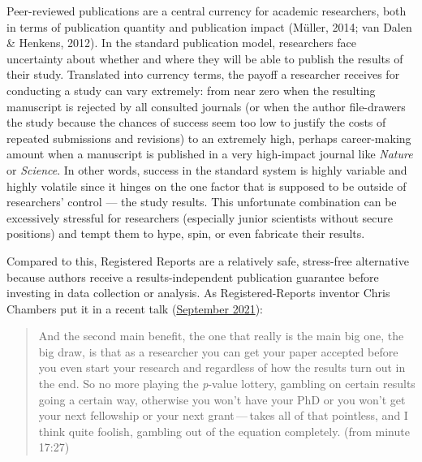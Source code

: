 \documentclass[british,,man,mask,floatsintext]{apa6}
\begin{document}
Peer-reviewed publications are a central currency for academic researchers, both in terms of publication quantity and publication impact (Müller, 2014; van Dalen \& Henkens, 2012).
In the standard publication model, researchers face uncertainty about whether and where they will be able to publish the results of their study. Translated into currency terms, the payoff a researcher receives for conducting a study can vary extremely:
from near zero when the resulting manuscript is rejected by all consulted journals (or when the author file-drawers the study because the chances of success seem too low to justify the costs of repeated submissions and revisions) to an extremely high, perhaps career-making amount when a manuscript is published in a very high-impact journal like \emph{Nature} or \emph{Science}.
In other words, success in the standard system is highly variable and highly volatile since it hinges on the one factor that is supposed to be outside of researchers' control --- the study results.
This unfortunate combination can be excessively stressful for researchers (especially junior scientists without secure positions) and tempt them to hype, spin, or even fabricate their results.

Compared to this, Registered Reports are a relatively safe, stress-free alternative because authors receive a results-independent publication guarantee before investing in data collection or analysis.
As Registered-Reports inventor Chris Chambers put it in a recent talk (\href{https://youtu.be/FiVI3cwVMZI?list=PLChfyH8TVDGmYENpXUDPaeeq2SLh8q9dt\&t=1047}{September 2021}):

\begin{quote}
And the second main benefit, the one that really is the main big one, the big draw, is that as a researcher you can get your paper accepted before you even start your research and regardless of how the results turn out in the end. So no more playing the \emph{p}-value lottery, gambling on certain results going a certain way, otherwise you won't have your PhD or you won't get your next fellowship or your next grant\(\,\)---\(\,\)takes all of that pointless, and I think quite foolish, gambling out of the equation completely. (from minute 17:27)
\end{quote}
\end{document}
